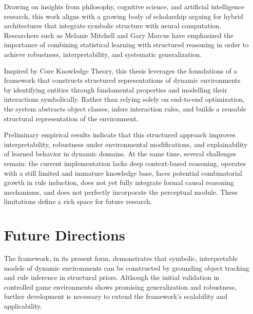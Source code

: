 \documentclass[12pt,a4paper]{report}
\begin{document}
Drawing on insights from philosophy, cognitive science, and artificial intelligence research, this work aligns with a growing body of scholarship arguing for hybrid architectures that integrate symbolic structure with neural computation. Researchers such as Melanie Mitchell and Gary Marcus have emphasized the importance of combining statistical learning with structured reasoning in order to achieve robustness, interpretability, and systematic generalization.

Inspired by Core Knowledge Theory, this thesis leverages the foundations of a framework that constructs structured representations of dynamic environments by identifying entities through fundamental properties and modelling their interactions symbolically. Rather than relying solely on end-to-end optimization, the system abstracts object classes, infers interaction rules, and builds a reusable structural representation of the environment.

Preliminary empirical results indicate that this structured approach improves interpretability, robustness under environmental modifications, and explainability of learned behavior in dynamic domains. At the same time, several challenges remain: the current implementation lacks deep context-based reasoning, operates with a still limited and immature knowledge base, faces potential combinatorial growth in rule induction, does not yet fully integrate formal causal reasoning mechanisms, and does not perfectly incorporate the perceptual module. These limitations define a rich space for future research.

\section{Future Directions}
The framework, in its present form, demonstrates that symbolic, interpretable models of dynamic environments can be constructed by grounding object tracking and rule inference in structural priors. Although the initial validation in controlled game environments shows promising generalization and robustness, further development is necessary to extend the framework's scalability and applicability.
\end{document}
